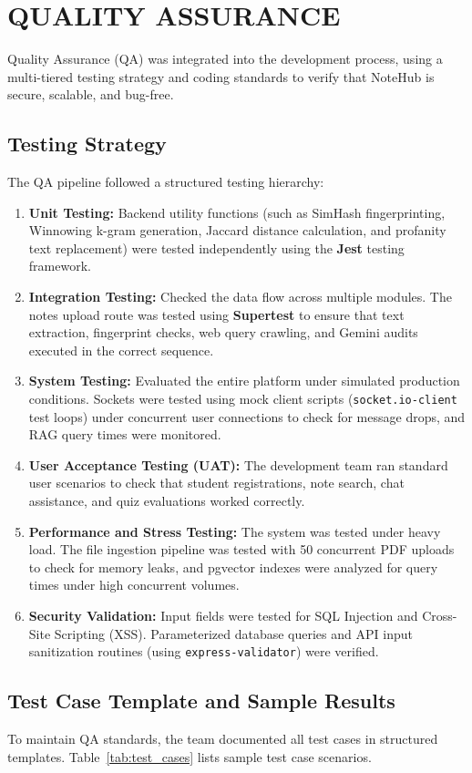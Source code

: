 \documentclass[12,Times new Roman,a4paper]{report}
\begin{document}
\section{QUALITY ASSURANCE}
Quality Assurance (QA) was integrated into the development process, using a multi-tiered testing strategy and coding standards to verify that NoteHub is secure, scalable, and bug-free.

\subsection{Testing Strategy}
The QA pipeline followed a structured testing hierarchy:
\begin{enumerate}
    \item \textbf{Unit Testing:} Backend utility functions (such as SimHash fingerprinting, Winnowing k-gram generation, Jaccard distance calculation, and profanity text replacement) were tested independently using the \textbf{Jest} testing framework.
    \item \textbf{Integration Testing:} Checked the data flow across multiple modules. The notes upload route was tested using \textbf{Supertest} to ensure that text extraction, fingerprint checks, web query crawling, and Gemini audits executed in the correct sequence.
    \item \textbf{System Testing:} Evaluated the entire platform under simulated production conditions. Sockets were tested using mock client scripts (\texttt{socket.io-client} test loops) under concurrent user connections to check for message drops, and RAG query times were monitored.
    \item \textbf{User Acceptance Testing (UAT):} The development team ran standard user scenarios to check that student registrations, note search, chat assistance, and quiz evaluations worked correctly.
    \item \textbf{Performance and Stress Testing:} The system was tested under heavy load. The file ingestion pipeline was tested with 50 concurrent PDF uploads to check for memory leaks, and pgvector indexes were analyzed for query times under high concurrent volumes.
    \item \textbf{Security Validation:} Input fields were tested for SQL Injection and Cross-Site Scripting (XSS). Parameterized database queries and API input sanitization routines (using \texttt{express-validator}) were verified.
\end{enumerate}

\subsection{Test Case Template and Sample Results}
To maintain QA standards, the team documented all test cases in structured templates. Table~\ref{tab:test_cases} lists sample test case scenarios.
\end{document}
